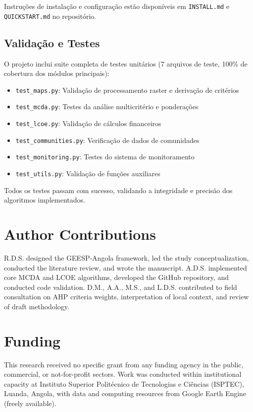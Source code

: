 \documentclass[12pt, a4paper]{article}
\begin{document}
Instruções de instalação e configuração estão disponíveis em \texttt{INSTALL.md} e \texttt{QUICKSTART.md} no repositório.

\subsection{Validação e Testes}

O projeto inclui suite completa de testes unitários (7 arquivos de teste, 100\% de cobertura dos módulos principais):

\begin{itemize}
    \item \texttt{test\_maps.py}: Validação de processamento raster e derivação de critérios
    \item \texttt{test\_mcda.py}: Testes da análise multicritério e ponderações
    \item \texttt{test\_lcoe.py}: Validação de cálculos financeiros
    \item \texttt{test\_communities.py}: Verificação de dados de comunidades
    \item \texttt{test\_monitoring.py}: Testes do sistema de monitoramento
    \item \texttt{test\_utils.py}: Validação de funções auxiliares
\end{itemize}

Todos os testes passam com sucesso, validando a integridade e precisão dos algoritmos implementados.

\section*{Author Contributions}
R.D.S. designed the GEESP-Angola framework, led the study conceptualization, conducted the literature review, and wrote the manuscript. A.D.S. implemented core MCDA and LCOE algorithms, developed the GitHub repository, and conducted code validation. D.M., A.A., M.S., and L.D.S. contributed to field consultation on AHP criteria weights, interpretation of local context, and review of draft methodology.

\section*{Funding}
This research received no specific grant from any funding agency in the public, commercial, or not-for-profit sectors. Work was conducted within institutional capacity at Instituto Superior Politécnico de Tecnologias e Ciências (ISPTEC), Luanda, Angola, with data and computing resources from Google Earth Engine (freely available).
\end{document}
